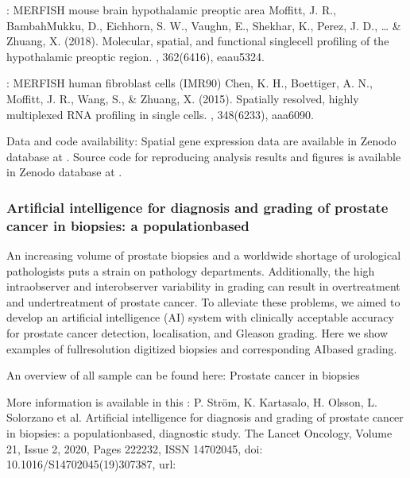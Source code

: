 \documentclass[letterpaper,10pt,english,openany,oneside]{sphinxmanual}
\begin{document}
\sphinxAtStartPar
{}: MERFISH mouse brain hypothalamic preoptic area Moffitt, J. R., Bambah\sphinxhyphen{}Mukku, D., Eichhorn, S. W., Vaughn, E., Shekhar, K., Perez, J. D., … \& Zhuang, X. (2018). Molecular, spatial, and functional single\sphinxhyphen{}cell profiling of the hypothalamic preoptic region. , 362(6416), eaau5324.

\sphinxAtStartPar
{}: MERFISH human fibroblast cells (IMR90) Chen, K. H., Boettiger, A. N., Moffitt, J. R., Wang, S., \& Zhuang, X. (2015). Spatially resolved, highly multiplexed RNA profiling in single cells. , 348(6233), aaa6090.

\sphinxAtStartPar
Data and code availability: Spatial gene expression data are available in Zenodo database at .
Source code for reproducing analysis results and figures is available in Zenodo database at .


\subsubsection{Artificial intelligence for diagnosis and grading of prostate cancer in biopsies: a population\sphinxhyphen{}based}
\label{\detokenize{docs/starting/projects:artificial-intelligence-for-diagnosis-and-grading-of-prostate-cancer-in-biopsies-a-population-based}}
\sphinxAtStartPar
An increasing volume of prostate biopsies and a worldwide shortage of urological pathologists puts a
strain on pathology departments. Additionally, the high intra\sphinxhyphen{}observer and inter\sphinxhyphen{}observer variability in grading can
result in overtreatment and undertreatment of prostate cancer. To alleviate these problems, we aimed to develop an
artificial intelligence (AI) system with clinically acceptable accuracy for prostate cancer detection, localisation, and
Gleason grading. Here we show examples of full\sphinxhyphen{}resolution digitized biopsies and corresponding AI\sphinxhyphen{}based grading.

\sphinxAtStartPar
{}

\sphinxAtStartPar
An overview of all sample  can be found here: Prostate cancer in biopsies 

\sphinxAtStartPar
More information is available in this : P. Ström, K. Kartasalo, H. Olsson, L. Solorzano et al. Artificial intelligence for diagnosis and grading of prostate cancer in biopsies: a population\sphinxhyphen{}based, diagnostic study. The Lancet Oncology, Volume 21, Issue 2, 2020, Pages 222\sphinxhyphen{}232, ISSN 1470\sphinxhyphen{}2045,  doi: 10.1016/S1470\sphinxhyphen{}2045(19)30738\sphinxhyphen{}7, url: 
\end{document}
